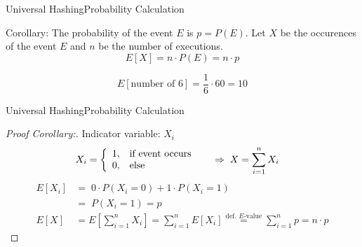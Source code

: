 
\begin{frame}{Universal Hashing}{Probability Calculation}
  \begin{block}{Corollary:}
    The probability of the event $E$ is $p = P(E)$.
    Let $X$ be the occurences of the event $E$ and $n$ be the number
    of executions.
    {\color{Mittel-Blau}\[E[X] = n \cdot P(E) = n \cdot p\]}
  \end{block}
  \begin{example}
    \[E\left[\text{number of 6}\right] = \frac{1}{6} \cdot 60 = 10\]
  \end{example}
\end{frame}


\begin{frame}{Universal Hashing}{Probability Calculation}
  \begin{proof}[Proof Corollary:]
    Indicator variable: {\color{Mittel-Blau}$X_i$}\\
    \vspace*{-1.5em}
    {\color{Mittel-Blau}
    \begin{align*}
      X_i &=
        \left\lbrace
          \begin{array}{ll}
            1, & \text{if event occurs}\\
            0, & \text{else}
          \end{array}
        \right. \hspace{1.5em}
        \Rightarrow \; X = \sum_{i=1}^{n} X_i
    \end{align*}}
    \vspace*{-1.0em}
    {\color{Mittel-Blau}
    \begin{align*}
      E[X_i]
        &= \; 0 \cdot P(X_i = 0) + 1 \cdot P(X_i = 1)\\
      {} &= \; P(X_i = 1) = p\\[0.5em]
      E[X] &= E\left[\sum_{i=1}^{n} X_i\right]
        = \sum_{i=1}^{n} E[X_i]
        \stackrel{\text{def. $E$-value}}{=}
        \sum_{i=1}^{n} p = n \cdot p
    \end{align*}}
    \qedhere
  \end{proof}
\end{frame}
